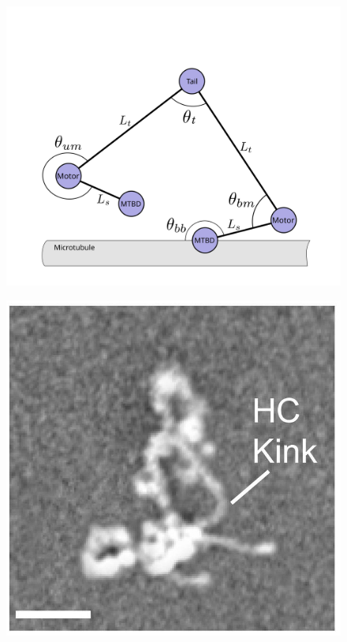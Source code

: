 \documentclass[9pt,twocolumn,twoside,lineno]{pnas-new}
\begin{document}
\begin{figure}
 \begin{minipage}{.3\textwidth}
   \centering
   \includegraphics[width=\linewidth]{figures/schematic-1-model}
   \label{fig:explengths}
 \end{minipage}
 \begin{minipage}{.3\textwidth}
   \centering
   \includegraphics[width=\linewidth]{figures/schematic-2-cryoem}

\end{minipage}
\end{figure}
\end{document}
